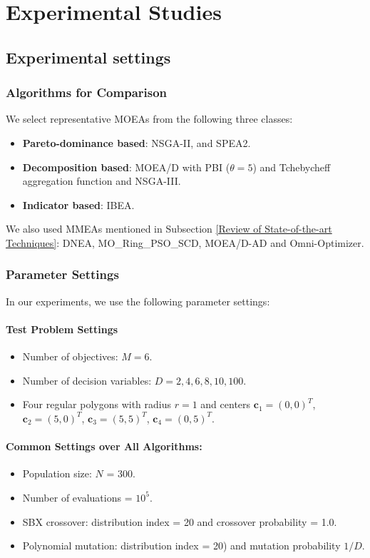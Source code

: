 \documentclass[conference]{IEEEtran}
\begin{document}
\section{Experimental Studies}

\label{Experimental Studies}
\subsection{Experimental settings}
\label{Experimental Settings}
\subsubsection{Algorithms for Comparison}
We select representative MOEAs from the following three classes:
\begin{itemize}
    \item \textbf{Pareto-dominance based}: NSGA-II\cite{deb2002fast}, and SPEA2\cite{zitzler2001spea2}.
    \item \textbf{Decomposition based}: MOEA/D \cite{zhang2007moea} with PBI ($\theta=5$) and Tchebycheff aggregation function and NSGA-III\cite{deb2013evolutionary}.
    \item \textbf{Indicator based}: IBEA\cite{zitzler2004indicator}.
\end{itemize}

We also used MMEAs mentioned in Subsection \ref{Review of State-of-the-art Techniques}: DNEA\cite{liu2018double}, MO\_Ring\_PSO\_SCD\cite{yue2017multiobjective}, MOEA/D-AD\cite{tanabe2018decomposition} and Omni-Optimizer\cite{deb2005omni}.
\subsubsection{Parameter Settings}
In our experiments, we use the following parameter settings: 
\paragraph{Test Problem Settings}
\begin{itemize}
     \item Number of objectives: $M=6$.
    \item Number of decision variables: $D=2, 4, 6, 8, 10, 100$.
    \item Four regular polygons with radius $r=1$ and centers $\boldsymbol{c}_1=(0, 0)^T$, $\boldsymbol{c}_2=(5, 0)^T$, $\boldsymbol{c}_3=(5, 5)^T$, $\boldsymbol{c}_4=(0, 5)^T$. 
\end{itemize}
\paragraph{Common Settings over All Algorithms:}
\begin{itemize}
    \item Population size: $N$ = 300.
    \item Number of evaluations = $10^5$.
    \item SBX crossover: distribution index = 20 and crossover probability = 1.0.
    \item Polynomial mutation:  distribution index = 20) and mutation probability $1/D$.
\end{itemize}
\end{document}
